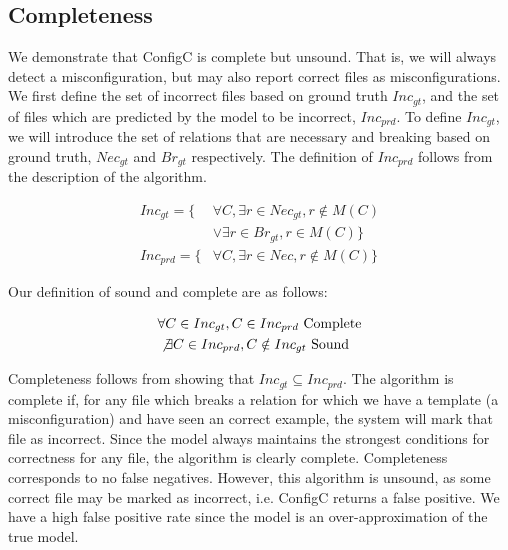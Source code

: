 
\subsection{Completeness}

We demonstrate that ConfigC is complete but unsound.
That is, we will always detect a misconfiguration, but may also report correct files as misconfigurations.
We first define the set of incorrect files based on ground truth $Inc_{gt}$, and the set of files which are predicted by the model to be incorrect, $Inc_{prd}$.
To define $Inc_{gt}$, we will introduce the set of relations that are necessary and breaking based on ground truth, $Nec_{gt}$ and $Br_{gt}$ respectively.
The definition of $Inc_{prd}$ follows from the description of the algorithm.

\begin{align}
Inc_{gt} = \{&\forall C, \exists r \in Nec_{gt}, r \notin M(C)\\ \nonumber
 &\lor \exists r \in Br_{gt}, r \in M(C)\} \\
Inc_{prd} = \{&\forall C, \exists r \in Nec, r \notin M(C)\}
\end{align}

Our definition of sound and complete are as follows:

\begin{align}
&\forall C \in Inc_{gt}, C \in Inc_{prd} \text{  Complete} \\
&\not \exists C \in Inc_{prd}, C \notin Inc_{gt} \text{  Sound}
\end{align}

Completeness follows from showing that $Inc_{gt} \subseteq Inc_{prd}$.
The algorithm is complete if, for any file which breaks a relation for which we have a template (a misconfiguration) and have seen an correct example, the system will mark that file as incorrect.
Since the model always maintains the strongest conditions for correctness for any file, the algorithm is clearly complete.
Completeness corresponds to no false negatives.
However, this algorithm is unsound, as some correct file may be marked as incorrect, i.e. ConfigC returns a false positive.
We have a high false positive rate since the model is an over-approximation of the true model.
